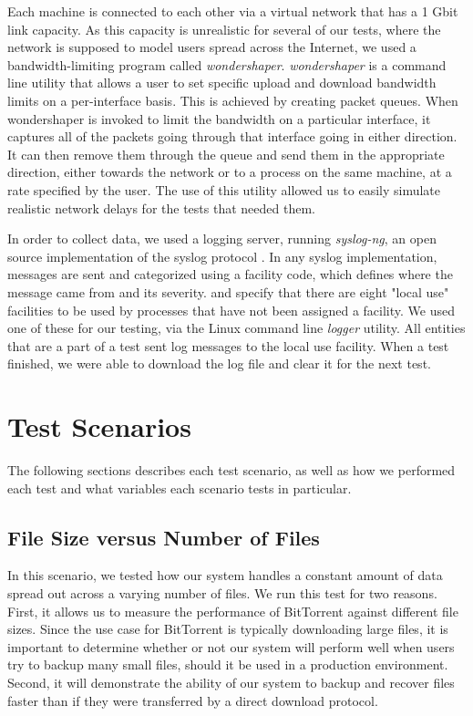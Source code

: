 \documentclass[12pt]{report}
\begin{document}
Each machine is connected to each other via a virtual network that has a 1 Gbit link capacity. As this capacity is unrealistic for several of our tests, where the network is supposed to model users spread across the Internet, we used a bandwidth-limiting program called \textit{wondershaper}. \textit{wondershaper} is a command line utility that allows a user to set specific upload and download bandwidth limits on a per-interface basis. This is achieved by creating packet queues. When wondershaper is invoked to limit the bandwidth on a particular interface, it captures all of the packets going through that interface going in either direction. It can then remove them through the queue and send them in the appropriate direction, either towards the network or to a process on the same machine, at a rate specified by the user. The use of this utility allowed us to easily simulate realistic network delays for the tests that needed them.

In order to collect data, we used a logging server, running \textit{syslog-ng}, an open source implementation of the syslog protocol \cite{syslogRFC1,syslogRFC2}. In any syslog implementation, messages are sent and categorized using a facility code, which defines where the message came from and its severity. \cite{syslogRFC1} and \cite{syslogRFC2} specify that there are eight "local use" facilities to be used by processes that have not been assigned a facility. We used one of these for our testing, via the Linux command line \textit{logger} utility. All entities that are a part of a test sent log messages to the local use facility. When a test finished, we were able to download the log file and clear it for the next test.

\section{Test Scenarios} \label{sec:TestScenatios_chap:Methodology}

The following sections describes each test scenario, as well as how we performed each test and what variables each scenario tests in particular.

\subsection{File Size versus Number of Files} \label{subsec:FileSizeversusNumberofFiles_sec:TestScenarios_chap:Methodology}

In this scenario, we tested how our system handles a constant amount of data spread out across a varying number of files. We run this test for two reasons. First, it allows us to measure the performance of BitTorrent against different file sizes. Since the use case for BitTorrent is typically downloading large files, it is important to determine whether or not our system will perform well when users try to backup many small files, should it be used in a production environment. Second, it will demonstrate the ability of our system to backup and recover files faster than if they were transferred by a direct download protocol.
\end{document}

